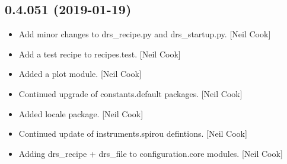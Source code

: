 \documentclass[a4paper,10pt,english]{report}
\begin{document}
\subsection{0.4.051 (2019-01-19)}
\label{\detokenize{misc/changelog:id211}}\begin{itemize}
\item {} 
Add minor changes to drs\_recipe.py and drs\_startup.py. {[}Neil Cook{]}

\item {} 
Add a test recipe to recipes.test. {[}Neil Cook{]}

\item {} 
Added a plot module. {[}Neil Cook{]}

\item {} 
Continued upgrade of constants.default packages. {[}Neil Cook{]}

\item {} 
Added locale package. {[}Neil Cook{]}

\item {} 
Continued update of instruments.spirou defintions. {[}Neil Cook{]}

\item {} 
Adding drs\_recipe + drs\_file  to configuration.core modules. {[}Neil
Cook{]}

\end{itemize}
\end{document}
